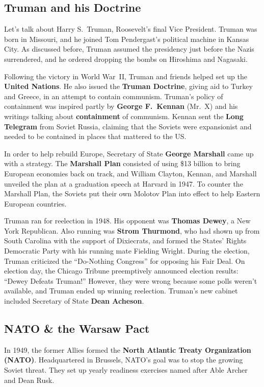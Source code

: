 \subsection*{Truman and his Doctrine}

Let's talk about Harry S.\ Truman, Roosevelt's final Vice President.
Truman was born in Missouri, and he joined Tom Pendergast's political machine in Kansas City.
As discussed before, Truman assumed the presidency just before the Nazis surrendered,
and he ordered dropping the bombs on Hiroshima and Nagasaki.

Following the victory in World War~II, Truman and friends helped set up the \textbf{United Nations}.
He also issued the \textbf{Truman Doctrine}, giving aid to Turkey and Greece, in an attempt to contain communism.
Truman's policy of containment was inspired partly by \textbf{George F.\ Kennan} (Mr.\ X)
and his writings talking about \textbf{containment} of communism.
Kennan sent the \textbf{Long Telegram} from Soviet Russia,
claiming that the Soviets were expansionist and needed to be contained in places that mattered to the US\@.

In order to help rebuild Europe, Secretary of State \textbf{George Marshall} came up with a strategy.
The \textbf{Marshall Plan} consisted of using \$13 billion to bring European economies back on track,
and William Clayton, Kennan, and Marshall unveiled the plan at a graduation speech at Harvard in 1947.
To counter the Marshall Plan, the Soviets put their own Molotov Plan into effect to help Eastern European countries.

Truman ran for reelection in 1948.
His opponent was \textbf{Thomas Dewey}, a New York Republican.
Also running was \textbf{Strom Thurmond}, who had shown up from South Carolina with the support of Dixiecrats,
and formed the States' Rights Democratic Party with his running mate Fielding Wright.
During the election, Truman criticized the ``Do-Nothing Congress'' for opposing his Fair Deal.
On election day, the Chicago Tribune preemptively announced election results: ``Dewey Defeats Truman!''
However, they were wrong because some polls weren't available, and Truman ended up winning reelection.
Truman's new cabinet included Secretary of State \textbf{Dean Acheson}.

\subsection*{NATO \& the Warsaw Pact}

In 1949, the former Allies formed the \textbf{North Atlantic Treaty Organization (NATO)}.
Headquartered in Brussels, NATO's goal was to stop the growing Soviet threat.
They set up yearly readiness exercises named after Able Archer and Dean Rusk.

